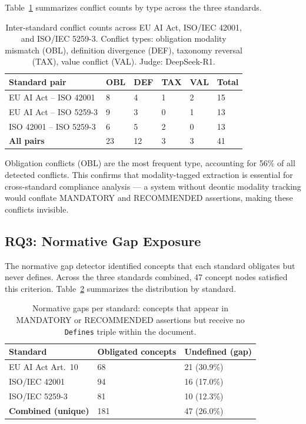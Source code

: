 Table~\ref{tab:conflicts} summarizes conflict counts by type across the three standards.

\begin{table}[t]
\centering
\caption{Inter-standard conflict counts across EU AI Act, ISO/IEC 42001, and ISO/IEC 5259-3. Conflict types: obligation modality mismatch (OBL), definition divergence (DEF), taxonomy reversal (TAX), value conflict (VAL). Judge: DeepSeek-R1.}
\label{tab:conflicts}
\begin{tabularx}{\columnwidth}{lXXXXX}
\toprule
\textbf{Standard pair} & \textbf{OBL} & \textbf{DEF} & \textbf{TAX} & \textbf{VAL} & \textbf{Total} \\
\midrule
EU AI Act -- ISO 42001    & 8  & 4 & 1 & 2 & 15 \\
EU AI Act -- ISO 5259-3   & 9  & 3 & 0 & 1 & 13 \\
ISO 42001 -- ISO 5259-3   & 6  & 5 & 2 & 0 & 13 \\
\midrule
\textbf{All pairs}        & 23 & 12 & 3 & 3 & 41 \\
\bottomrule
\end{tabularx}
\end{table}

Obligation conflicts (OBL) are the most frequent type, accounting for 56\% of all detected conflicts. This confirms that modality-tagged extraction is essential for cross-standard compliance analysis — a system without deontic modality tracking would conflate MANDATORY and RECOMMENDED assertions, making these conflicts invisible.

\subsection{RQ3: Normative Gap Exposure}

The normative gap detector identified concepts that each standard obligates but never defines. Across the three standards combined, 47 concept nodes satisfied this criterion. Table~\ref{tab:gaps} summarizes the distribution by standard.

\begin{table}[t]
\centering
\caption{Normative gaps per standard: concepts that appear in MANDATORY or RECOMMENDED assertions but receive no \texttt{Defines} triple within the document.}
\label{tab:gaps}
\begin{tabularx}{\columnwidth}{lXX}
\toprule
\textbf{Standard} & \textbf{Obligated concepts} & \textbf{Undefined (gap)} \\
\midrule
EU AI Act Art.\ 10 & 68  & 21 (30.9\%) \\
ISO/IEC 42001      & 94  & 16 (17.0\%) \\
ISO/IEC 5259-3     & 81  & 10 (12.3\%) \\
\midrule
\textbf{Combined (unique)} & 181 & 47 (26.0\%) \\
\bottomrule
\end{tabularx}
\end{table}

